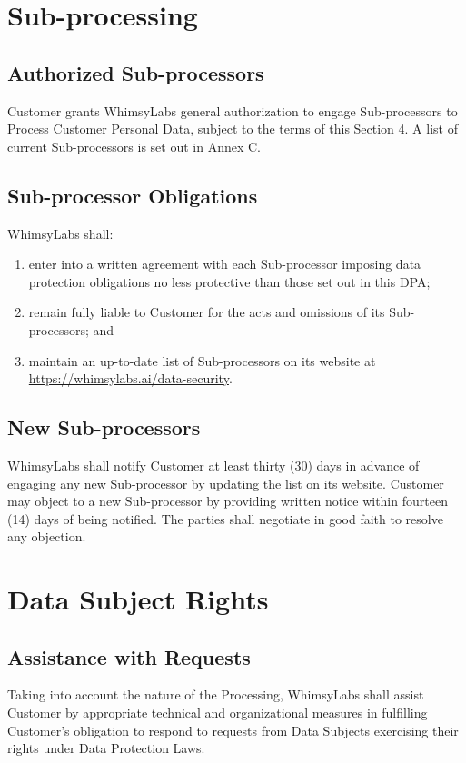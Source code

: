 \documentclass[11pt,a4paper]{article}
\begin{document}
\section{Sub-processing}

\subsection{Authorized Sub-processors}
Customer grants WhimsyLabs general authorization to engage Sub-processors to Process Customer Personal Data, subject to the terms of this Section 4. A list of current Sub-processors is set out in Annex C.

\subsection{Sub-processor Obligations}
WhimsyLabs shall:
\begin{enumerate}[label=(\alph*)]
    \item enter into a written agreement with each Sub-processor imposing data protection obligations no less protective than those set out in this DPA;
    \item remain fully liable to Customer for the acts and omissions of its Sub-processors; and
    \item maintain an up-to-date list of Sub-processors on its website at \url{https://whimsylabs.ai/data-security}.
\end{enumerate}

\subsection{New Sub-processors}
WhimsyLabs shall notify Customer at least thirty (30) days in advance of engaging any new Sub-processor by updating the list on its website. Customer may object to a new Sub-processor by providing written notice within fourteen (14) days of being notified. The parties shall negotiate in good faith to resolve any objection.

\section{Data Subject Rights}

\subsection{Assistance with Requests}
Taking into account the nature of the Processing, WhimsyLabs shall assist Customer by appropriate technical and organizational measures in fulfilling Customer's obligation to respond to requests from Data Subjects exercising their rights under Data Protection Laws.
\end{document}
